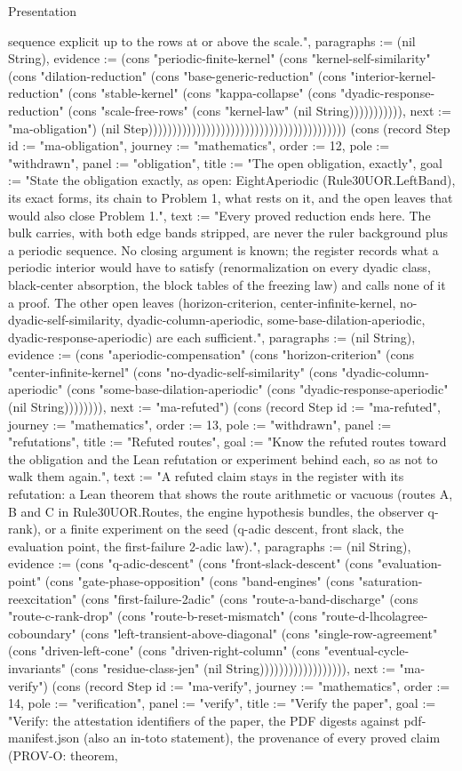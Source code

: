 \begin{lexlean}{Presentation}
\begin{semanticmodule}
{sequence explicit up to the rows at or above the scale.", paragraphs := (nil String), evidence := (cons "periodic-finite-kernel" (cons "kernel-self-similarity" (cons "dilation-reduction" (cons "base-generic-reduction" (cons "interior-kernel-reduction" (cons "stable-kernel" (cons "kappa-collapse" (cons "dyadic-response-reduction" (cons "scale-free-rows" (cons "kernel-law" (nil String))))))))))), next := "ma-obligation"}) (nil Step))))))))))))))))))))))))))))))))))))))))) (cons (record Step {id := "ma-obligation", journey := "mathematics", order := 12, pole := "withdrawn", panel := "obligation", title := "The open obligation, exactly", goal := "State the obligation exactly, as open: EightAperiodic (Rule30UOR.LeftBand), its exact forms, its chain to Problem 1, what rests on it, and the open leaves that would also close Problem 1.", text := "Every proved reduction ends here. The bulk carries, with both edge bands stripped, are never the ruler background plus a periodic sequence. No closing argument is known; the register records what a periodic interior would have to satisfy (renormalization on every dyadic class, black-center absorption, the block tables of the freezing law) and calls none of it a proof. The other open leaves (horizon-criterion, center-infinite-kernel, no-dyadic-self-similarity, dyadic-column-aperiodic, some-base-dilation-aperiodic, dyadic-response-aperiodic) are each sufficient.", paragraphs := (nil String), evidence := (cons "aperiodic-compensation" (cons "horizon-criterion" (cons "center-infinite-kernel" (cons "no-dyadic-self-similarity" (cons "dyadic-column-aperiodic" (cons "some-base-dilation-aperiodic" (cons "dyadic-response-aperiodic" (nil String)))))))), next := "ma-refuted"}) (cons (record Step {id := "ma-refuted", journey := "mathematics", order := 13, pole := "withdrawn", panel := "refutations", title := "Refuted routes", goal := "Know the refuted routes toward the obligation and the Lean refutation or experiment behind each, so as not to walk them again.", text := "A refuted claim stays in the register with its refutation: a Lean theorem that shows the route arithmetic or vacuous (routes A, B and C in Rule30UOR.Routes, the engine hypothesis bundles, the observer q-rank), or a finite experiment on the seed (q-adic descent, front slack, the evaluation point, the first-failure 2-adic law).", paragraphs := (nil String), evidence := (cons "q-adic-descent" (cons "front-slack-descent" (cons "evaluation-point" (cons "gate-phase-opposition" (cons "band-engines" (cons "saturation-reexcitation" (cons "first-failure-2adic" (cons "route-a-band-discharge" (cons "route-c-rank-drop" (cons "route-b-reset-mismatch" (cons "route-d-lhcolagree-coboundary" (cons "left-transient-above-diagonal" (cons "single-row-agreement" (cons "driven-left-cone" (cons "driven-right-column" (cons "eventual-cycle-invariants" (cons "residue-class-jen" (nil String)))))))))))))))))), next := "ma-verify"}) (cons (record Step {id := "ma-verify", journey := "mathematics", order := 14, pole := "verification", panel := "verify", title := "Verify the paper", goal := "Verify: the attestation identifiers of the paper, the PDF digests against pdf-manifest.json (also an in-toto statement), the provenance of every proved claim (PROV-O: theorem, }
\end{semanticmodule}
\end{lexlean}
